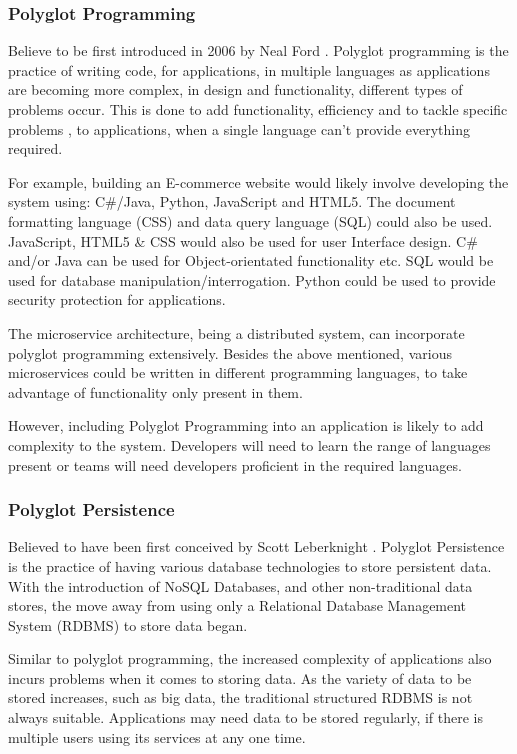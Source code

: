 \subsubsection{Polyglot Programming}
Believe to be first introduced in 2006 by Neal Ford \cite{PolyglotOrigins}.
Polyglot programming is the practice of writing code, for applications, in multiple languages \cite{PolyglotProgTechTarget} as applications are becoming more complex, in design and functionality, different types of problems occur. This is done to add functionality, efficiency and to tackle specific problems \cite{PolyglotMFowler}, to applications, when a single language can't provide everything required. 

For example, building an E-commerce website would likely involve developing the system using: C\#/Java, Python, JavaScript and HTML5. The document formatting language (CSS) and data query language (SQL) could also be used. JavaScript, HTML5 \& CSS would also be used for user Interface design. C\# and/or Java can be used for Object-orientated functionality etc. SQL would be used for database manipulation/interrogation. Python could be used to provide security protection for applications.

The microservice architecture, being a distributed system, can incorporate polyglot programming extensively. Besides the above mentioned, various microservices could be written in different programming languages, to take advantage of functionality only present in them. 

However, including Polyglot Programming into an application is likely to add complexity to the system. Developers will need to learn the range of languages present or teams will need developers proficient in the required languages.
\subsubsection{Polyglot Persistence}
Believed to have been first conceived by Scott Leberknight \cite{PolyglotPersistLeberknight}. Polyglot Persistence is the practice of having various database technologies to store persistent data. With the introduction of NoSQL Databases, and other non-traditional data stores, the move away from using only a Relational Database Management System (RDBMS) to store data began. 

Similar to polyglot programming, the increased complexity of applications also incurs problems when it comes to storing data. As the variety of data to be stored increases, such as big data, the traditional structured RDBMS is not always suitable. Applications may need data to be stored regularly, if there is multiple users using its services at any one time.


